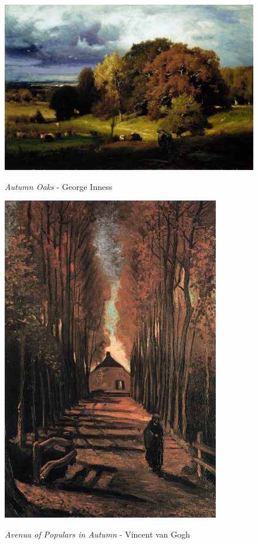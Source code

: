 \documentclass[a4paper]{article}
\begin{document}
\begin {figure}[h!]
\centering
\begin{minipage}[b]{.49\textwidth}
	\centering
	\includegraphics[width=\textwidth]{ForestPaintings/_Ext__Stl__George_Inness_-_Autumn_Oaks.jpg}
    \caption{\emph{Autumn Oaks} - George Inness}
\end{minipage}
\hfill
\begin{minipage}[b]{.49\textwidth}
	\centering
	\includegraphics[width=0.85\textwidth]{ForestPaintings/_Stl___Wth__Vincent_van_Gogh_-_Avenua_of_Populars_in_Autumn.jpg}
    \caption{\emph{Avenua of Populars in Autumn} - Vincent van Gogh}
\end{minipage}
\end{figure}
\end{document}
